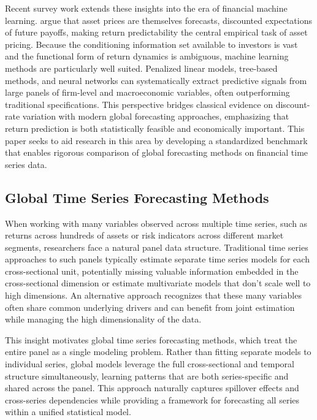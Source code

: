 \documentclass{article}
\begin{document}
Recent survey work extends these insights into the era of financial machine learning. \citet{Kelly2023} argue that asset prices are themselves forecasts, discounted expectations of future payoffs, making return predictability the central empirical task of asset pricing. Because the conditioning information set available to investors is vast and the functional form of return dynamics is ambiguous, machine learning methods are particularly well suited. Penalized linear models, tree-based methods, and neural networks can systematically extract predictive signals from large panels of firm-level and macroeconomic variables, often outperforming traditional specifications. This perspective bridges classical evidence on discount-rate variation with modern global forecasting approaches, emphasizing that return prediction is both statistically feasible and economically important. This paper seeks to aid research in this area by developing a standardized benchmark that enables rigorous comparison of global forecasting methods on financial time series data. 


\subsection{Global Time Series Forecasting Methods}

When working with many variables observed across multiple time series, such as returns across hundreds of assets or risk indicators across different market segments, researchers face a natural panel data structure. Traditional time series approaches to such panels typically estimate separate time series models for each cross-sectional unit, potentially missing valuable information embedded in the cross-sectional dimension or estimate multivariate models that don't scale well to high dimensions. An alternative approach recognizes that these many variables often share common underlying drivers and can benefit from joint estimation while managing the high dimensionality of the data.

This insight motivates global time series forecasting methods, which treat the entire panel as a single modeling problem. Rather than fitting separate models to individual series, global models leverage the full cross-sectional and temporal structure simultaneously, learning patterns that are both series-specific and shared across the panel. This approach naturally captures spillover effects and cross-series dependencies while providing a framework for forecasting all series within a unified statistical model.
\end{document}
